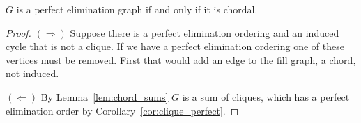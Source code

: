 \documentclass{article}
\begin{document}
\begin{theorem}
    $G$ is a perfect elimination graph if and only if it is chordal.
\end{theorem}
\begin{proof}
    \noindent
    $(\Rightarrow)$ Suppose there is a perfect elimination ordering and an induced cycle that is not a clique.
    If we have a perfect elimination ordering one of these vertices must be removed.
    First that would add an edge to the fill graph, a chord, not induced.

    \noindent
    $(\Leftarrow)$ By Lemma~\ref{lem:chord_sums} $G$ is a sum of cliques, which has a perfect elimination order by Corollary~\ref{cor:clique_perfect}.
\end{proof}
\end{document}
